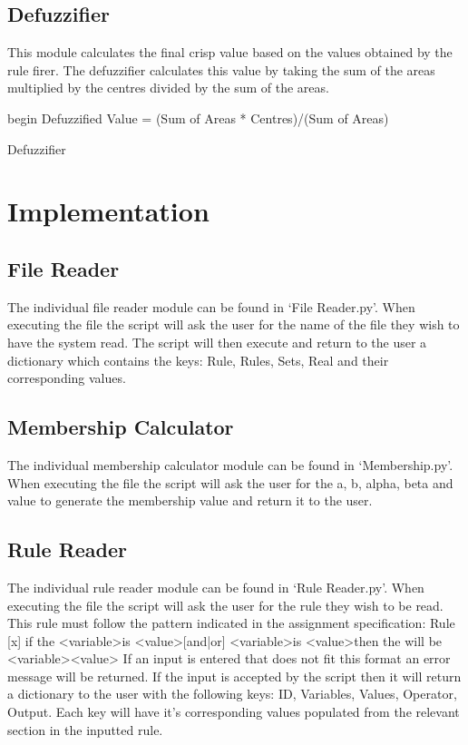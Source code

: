 \documentclass{article}
\begin{document}
\subsection{Defuzzifier} \label {defuzz}
This module calculates the final crisp value based on the values obtained by the rule firer. The defuzzifier calculates this value by taking the sum of the areas multiplied by the centres divided by the sum of the areas.

\begin{algorithm}[H]
\SetAlgoLined
{}
 begin\;
Defuzzified Value = (Sum of Areas * Centres)/(Sum of Areas)
 \caption{Defuzzifier}
\end{algorithm}

\section{Implementation}

\subsection{File Reader}
The individual file reader module can be found in ‘File Reader.py’. When executing the file the script will ask the user for the name of the file they wish to have the system read.  The script will then execute and return to the user a dictionary which contains the keys: Rule, Rules, Sets, Real and their corresponding values.

\subsection{Membership Calculator}
The individual membership calculator module can be found in ‘Membership.py’. When executing the file the script will ask the user for the a, b, alpha, beta and value to generate the membership value and return it to the user.  

\subsection{Rule Reader}
The individual rule reader module can be found in ‘Rule Reader.py’. When executing the file the script will ask the user for the rule they wish to be read. This rule must follow the pattern indicated in the assignment specification: Rule [x] if the \textless variable\textgreater is \textless value\textgreater [and|or] \textless variable\textgreater is \textless value\textgreater then the will be \textless variable\textgreater \textless value\textgreater
If an input is entered that does not fit this format an error message will be returned. If the input is accepted by the script then it will return a dictionary to the user with the following keys: ID, Variables, Values, Operator, Output. Each key will have it’s corresponding values populated from the relevant section in the inputted rule. 
\end{document}
